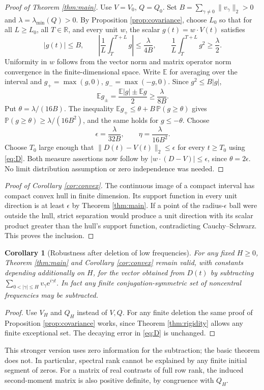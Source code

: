 \documentclass[11pt]{article}
\newtheorem{corollary}[theorem]{Corollary}
\newcommand{\R}{\mathbb R}\newcommand{\C}{\mathbb C}\newcommand{\Z}{\mathbb Z}\newcommand{\e}{\mathrm e}\newcommand{\dd}{\,\mathrm d}\newcommand{\id}{\mathrm I}\newcommand{\ord}{\operatorname{ord}}\newcommand{\Rea}{\operatorname{Re}}\newcommand{\conv}{\operatorname{conv}}\newcommand{\norm}[1]{\lVert#1\rVert}\newcommand{\ph}{\varphi(q)}
\begin{document}
\begin{proof}[Proof of Theorem \ref{thm:main}]
Use $V=V_0$, $Q=Q_0$. Set $B=\sum_{\gamma\ne0}\norm{v_\gamma}_2>0$ and $\lambda=\lambda_{\min}(Q)>0$. By Proposition \ref{prop:covariance}, choose $L_0$ so that for all $L\ge L_0$, all $T\in\R$, and every unit $w$, the scalar $g(t)=w\cdot V(t)$ satisfies
\[
 |g(t)|\le B,\qquad
 \left|\frac1L\int_T^{T+L}g\right|\le\frac{\lambda}{4B},\qquad
 \frac1L\int_T^{T+L}g^2\ge\frac{\lambda}{2}.
\]
Uniformity in $w$ follows from the vector norm and matrix operator norm convergence in the finite-dimensional space. Write $\mathbb E$ for averaging over the interval and $g_+=\max(g,0)$, $g_-=\max(-g,0)$. Since $g^2\le B|g|$,
\[
 \mathbb E g_\pm=\frac{\mathbb E|g|\pm\mathbb E g}{2}\ge\frac{\lambda}{8B}.
\]
Put $\theta=\lambda/(16B)$. The inequality $\mathbb E g_+\le\theta+B\,\mathbb P(g\ge\theta)$ gives $\mathbb P(g\ge\theta)\ge\lambda/(16B^2)$, and the same holds for $g\le-\theta$. Choose
\begin{equation}\label{eq:constants}
 \epsilon=\frac{\lambda}{32B},\qquad \eta=\frac{\lambda}{16B^2}.
\end{equation}
Choose $T_0$ large enough that $\norm{D(t)-V(t)}_2\le\epsilon$ for every $t\ge T_0$ using \eqref{eq:D}. Both measure assertions now follow by $|w\cdot(D-V)|\le\epsilon$, since $\theta=2\epsilon$. No limit distribution assumption or zero independence was needed.
\end{proof}
\begin{proof}[Proof of Corollary \ref{cor:convex}]
The continuous image of a compact interval has compact convex hull in finite dimension. Its support function in every unit direction is at least $\epsilon$ by Theorem \ref{thm:main}. If a point of the radius-$\epsilon$ ball were outside the hull, strict separation would produce a unit direction with its scalar product greater than the hull's support function, contradicting Cauchy--Schwarz. This proves the inclusion.
\end{proof}

\begin{corollary}[Robustness after deletion of low frequencies]\label{cor:tail}
For any fixed $H\ge0$, Theorem \ref{thm:main} and Corollary \ref{cor:convex} remain valid, with constants depending additionally on $H$, for the vector obtained from $D(t)$ by subtracting $\sum_{0<|\gamma|\le H} v_\gamma\e^{i\gamma t}$. In fact any finite conjugation-symmetric set of noncentral frequencies may be subtracted.
\end{corollary}
\begin{proof}
Use $V_H$ and $Q_H$ instead of $V,Q$. For any finite deletion the same proof of Proposition \ref{prop:covariance} works, since Theorem \ref{thm:rigidity} allows any finite exceptional set. The decaying error in \eqref{eq:D} is unchanged.
\end{proof}
This stronger version uses zero information for the subtraction; the basic theorem does not. In particular, spectral rank cannot be explained by any finite initial segment of zeros. For a matrix of real contrasts of full row rank, the induced second-moment matrix is also positive definite, by congruence with $Q_H$.
\end{document}
